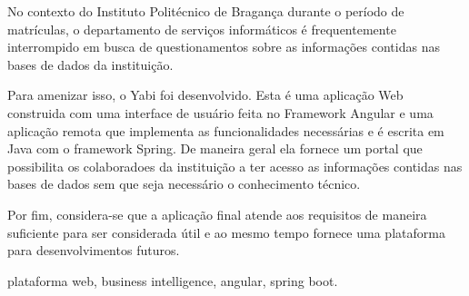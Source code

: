 
No contexto do Instituto Politécnico de Bragança durante o período de matrículas, o departamento de serviços informáticos é frequentemente interrompido em busca de questionamentos sobre as informações contidas nas bases de dados da instituição.

Para amenizar isso, o Yabi foi desenvolvido. Esta é uma aplicação Web construida com uma interface de usuário feita no Framework Angular e uma aplicação remota que implementa as funcionalidades necessárias e é escrita em Java com o framework Spring. De maneira geral ela fornece um portal que possibilita os colaboradoes da instituição a ter acesso as informações contidas nas bases de dados sem que seja necessário o conhecimento técnico.

Por fim, considera-se que a aplicação final atende aos requisitos de maneira suficiente para ser considerada útil e ao mesmo tempo fornece uma plataforma para desenvolvimentos futuros.

\mbox{}\linebreak
{} plataforma web, business intelligence, angular, spring boot.


